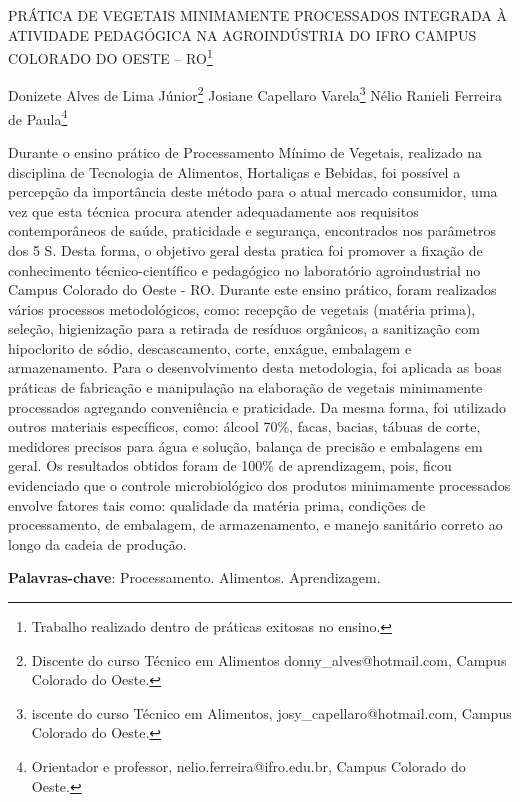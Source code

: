 \documentclass[article,12pt,onesidea,4paper,english,brazil]{abntex2}
\begin{document}
	
	
	\frenchspacing 
	
	\begin{center}
		\LARGE PRÁTICA DE VEGETAIS MINIMAMENTE PROCESSADOS INTEGRADA À ATIVIDADE PEDAGÓGICA NA AGROINDÚSTRIA DO IFRO CAMPUS COLORADO DO OESTE -- RO\footnote{Trabalho realizado dentro de práticas exitosas no ensino.}
		
		\normalsize
		Donizete Alves de Lima Júnior\footnote{Discente do curso Técnico em Alimentos donny\_alves@hotmail.com, Campus Colorado do Oeste.} 
		Josiane Capellaro Varela\footnote{iscente do curso Técnico em Alimentos, josy\_capellaro@hotmail.com, Campus Colorado do Oeste.} 
		Nélio Ranieli Ferreira de Paula\footnote{Orientador e professor, nelio.ferreira@ifro.edu.br, Campus Colorado do Oeste.} 
	\end{center}
	
	\noindent Durante o ensino prático de Processamento Mínimo de Vegetais, realizado na disciplina de Tecnologia de Alimentos, Hortaliças e Bebidas, foi possível a percepção da importância deste método para o atual mercado consumidor, uma vez que esta técnica procura atender adequadamente aos requisitos contemporâneos de saúde, praticidade e segurança, encontrados nos parâmetros dos 5 S. Desta forma, o objetivo geral desta pratica foi promover a fixação de conhecimento técnico-científico e pedagógico no laboratório agroindustrial no Campus Colorado do Oeste - RO. Durante este ensino prático, foram realizados vários processos metodológicos, como: recepção de vegetais (matéria prima), seleção, higienização para a retirada de resíduos orgânicos, a sanitização com hipoclorito de sódio, descascamento, corte, enxágue, embalagem e armazenamento. Para o desenvolvimento desta metodologia, foi aplicada as boas práticas de fabricação e manipulação na elaboração de vegetais minimamente processados agregando conveniência e praticidade. Da mesma forma, foi utilizado outros materiais específicos, como: álcool 70\%, facas, bacias, tábuas de corte, medidores precisos para água e solução, balança de precisão e embalagens em geral. Os resultados obtidos foram de 100\% de aprendizagem, pois, ficou evidenciado que o controle microbiológico dos produtos minimamente processados envolve fatores tais como: qualidade da matéria prima, condições de processamento, de embalagem, de armazenamento, e manejo sanitário correto ao longo da cadeia de produção.
	
	\vspace{\onelineskip}
	
	\noindent
	\textbf{Palavras-chave}: Processamento. Alimentos. Aprendizagem.
	
\end{document}
